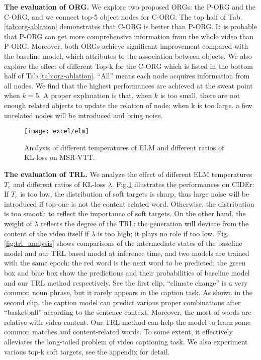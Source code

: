 \documentclass[10pt,twocolumn,letterpaper]{article}
\begin{document}
\textbf{The evaluation of ORG.} We explore two proposed ORGs: the P-ORG and the C-ORG, and we connect top-5 object nodes for C-ORG. The top half of Tab.\ref{tab:org-ablation} demonstrates that C-ORG is better than P-ORG. It is probable that P-ORG can get more comprehensive information from the whole video than P-ORG. Moreover, both ORGs achieve significant improvement compared with the baseline model, which attributes to the association between objects.
We also explore the effect of different Top-k for the C-ORG which is listed in the bottom half of Tab.\ref{tab:org-ablation}. ``All'' means each node acquires information from all nodes. We find that the highest performances are achieved at the sweat point when $k=5$. A proper explanation is that, when $k$ is too small, there are not enough related objects to update the relation of node; when k is too large, a few unrelated nodes will be introduced and bring noise.


 \begin{figure}
	\centering
	\texttt{[image: excel/elm]}
	\caption{Analysis of different temperatures of ELM and different ratios of KL-loss on MSR-VTT.}
	\label{fig:temp and kl ratio}
	\vspace{-0.5cm}
\end{figure}


\textbf{The evaluation of TRL.} We analyze the effect of different ELM temperatures $T_e$ and different ratios of KL-loss $\lambda$. Fig.\ref{fig:temp and kl ratio} illustrates the performances on CIDEr: If $T_e$ is too low, the distribution of soft targets is sharp, thus large noise will be introduced if top-one is not the content related word. Otherwise, the distribution is too smooth to reflect the importance of soft targets. On the other hand, the weight of $\lambda$ reflects the degree of the TRL: the generation will deviate from the content of the video itself if $\lambda$ is too high; it plays no role if too low. Fig.\ref{fig:trl_analysis} shows comparisons of the intermediate states of the baseline model and our TRL based model at inference time, and two models are trained with the same epoch: the red word is the next word to be predicted; the green box and blue box show the predictions and their probabilities of baseline model and our TRL method respectively. See the first clip, ``climate change'' is a very common noun phrase, but it rarely appears in the caption task. As shown in the second clip, the caption model can predict various proper combinations after ``basketball'' according to the sentence context. Moreover, the most of words are relative with video content. Our TRL method can help the model to learn some common matches and content-related words. To some extent, it effectively alleviates the long-tailed problem of video captioning task. We also experiment various top-k soft targets, see the appendix for detail.
\end{document}
